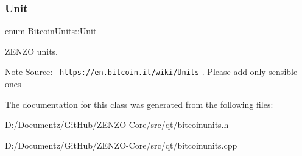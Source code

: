 \subsubsection{\texorpdfstring{Unit}{Unit}}
{\footnotesize\ttfamily enum \mbox{\hyperlink{class_bitcoin_units_ae41018ba530b4c8bdc74fd163709fb9d}{Bitcoin\+Units\+::\+Unit}}}

Z\+E\+N\+ZO units. \begin{DoxyNote}{Note}
Source\+: \href{https://en.bitcoin.it/wiki/Units}{\texttt{ https\+://en.\+bitcoin.\+it/wiki/\+Units}} . Please add only sensible ones 
\end{DoxyNote}


The documentation for this class was generated from the following files\+:\begin{DoxyCompactItemize}
\item 
D\+:/\+Documentz/\+Git\+Hub/\+Z\+E\+N\+Z\+O-\/\+Core/src/qt/bitcoinunits.\+h\item 
D\+:/\+Documentz/\+Git\+Hub/\+Z\+E\+N\+Z\+O-\/\+Core/src/qt/bitcoinunits.\+cpp\end{DoxyCompactItemize}
